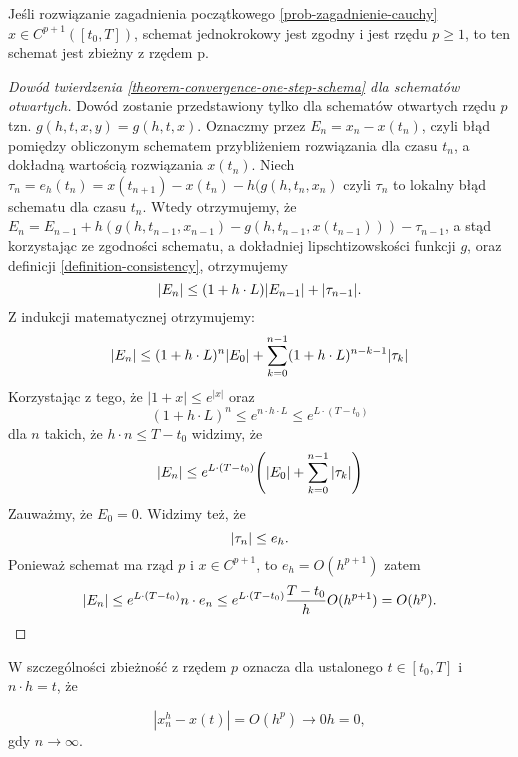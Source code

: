 \documentclass[12pt,a4paper]{report}
\begin{document}
\begin{theorem} \label{theorem-convergence-one-step-schema} 
Jeśli rozwiązanie zagadnienia początkowego \ref{prob-zagadnienie-cauchy} $x \in C^{p+1}([t_0,T])$, schemat jednokrokowy jest zgodny i jest rzędu $p\geqslant1$, to ten schemat jest zbieżny z rzędem p. 

\end{theorem}
\begin{proof}[Dowód twierdzenia \ref{theorem-convergence-one-step-schema} dla schematów otwartych]

Dowód zostanie przedstawiony tylko dla schematów otwartych rzędu $p$  tzn. $g(h,t,x,y) = g(h,t,x)$. 
Oznaczmy przez $E_n = x_n - x(t_n)$, czyli błąd pomiędzy obliczonym schematem przybliżeniem rozwiązania dla czasu $t_n$, a dokładną wartością rozwiązania $x(t_n)$. Niech $\tau_n = e_h(t_n) = x(t_{n+1}) - x(t_n) - h(g(h,t_n,x_n) $ czyli $\tau_n$ to lokalny błąd schematu dla czasu $t_n$. Wtedy otrzymujemy, że 
$E_n = E_{n-1} + h(g(h,t_{n-1},x_{n-1}) - g(h,t_{n-1},x(t_{n-1}))) - \tau_{n-1} $,
a stąd korzystając ze zgodności schematu, a dokładniej lipschtizowskości funkcji $g$, oraz definicji \ref{definition-consistency}, otrzymujemy
$$
{\left| {E_n} \right|} \leq (1 + h \cdot L) {\left| {E_{n-1}} \right|} + {\left| {\tau_{n-1}} \right|} .
$$
Z indukcji matematycznej otrzymujemy:
$$
\abs{E_n} \leq (1 + h \cdot L)^{n} \abs{E_0} + \sum_{k=0}^{n-1} (1+ h \cdot L)^{n-k-1} \abs{\tau_k} 
$$
Korzystając z tego, że $|1+x|\leqslant e^{|x|}$ oraz 
$$
(1 + h \cdot L)^{n} \leq e^{n \cdot h \cdot L} \leq e^{L \cdot (T-t_0)} 
$$
dla $n$ takich, że $h\cdot n\leq  T - t_0 $ widzimy, że
$$
\abs{E_n} \leq e^{L \cdot (T-t_0)} \bracket{\abs{E_0} + \sum_{k=0}^{n-1}\abs{\tau_k}}
$$
Zauważmy, że $E_0 = 0$. Widzimy też, że 
$$
{\left| {\tau_n} \right|} \leq e_h.
$$
Ponieważ schemat ma rząd $p$ i $x \in C^{p+1}$, to $ e_h = O(h^{p+1}) $ zatem 
$$ 
{\left| {E_n} \right|} \leq e^{L\cdot(T-t_0)} n \cdot e_n \leq e^{L \cdot (T-t_0)} \frac{T-t_0}{h}O(h^{p+1}) = O(h^p).
$$ 

\end{proof}

\begin{remark*}
W szczególności zbieżność z rzędem $p$ oznacza dla ustalonego $t \in [t_0,T]$ i $n \cdot h = t$, że

$$
|x_n^{h} - x(t)| = O(h^{p}) \to 0  h = 0,
$$
gdy $n \to \infty$. 
\end{remark*}
\end{document}
